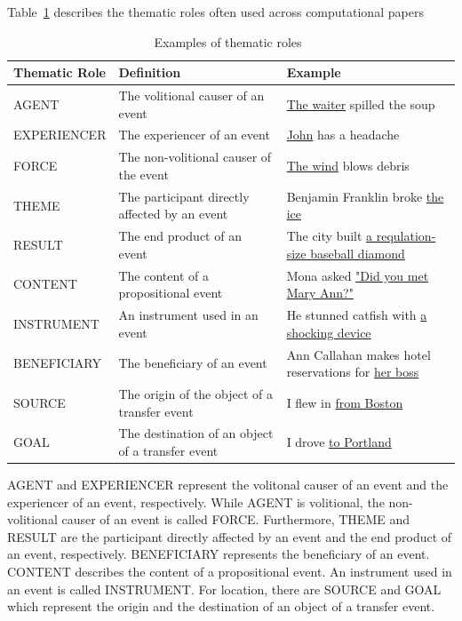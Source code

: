 Table~\ref{tab:examplesrl3} describes the thematic roles often used across computational papers~\citep{jurafsky2016speech}
\begin{table}
	\scriptsize
	\centering
	\caption{Examples of thematic roles~\citep{jurafsky2016speech}}
	\label{tab:examplesrl3}
	\begin{tabular}{lll}
		\hline
		\textbf{Thematic Role} & \textbf{Definition} & \textbf{Example} \\
		\hline
		AGENT & The volitional causer of an event & \underline{The waiter} spilled the soup \\
		EXPERIENCER & The experiencer of an event & \underline{John} has a headache \\
		FORCE & The non-volitional causer of the event & \underline{The wind} blows debris \\
		THEME & The participant directly affected by an event & Benjamin Franklin broke \underline{the ice} \\
		RESULT & The end product of an event & The city built \underline{a requlation-size baseball diamond} \\
		CONTENT & The content of a propositional event & Mona asked \underline{"Did you met Mary Ann?"} \\
		INSTRUMENT & An instrument used in an event & He stunned catfish with \underline{a shocking device} \\
		BENEFICIARY & The beneficiary of an event & Ann Callahan makes hotel reservations for \underline{her boss} \\
		SOURCE & The origin of the object of a transfer event & I flew in \underline{from Boston} \\
		GOAL & The destination of an object of a transfer event & I drove \underline{to Portland} \\
		\hline
	\end{tabular}

\end{table}

AGENT and EXPERIENCER represent the volitonal causer of an event and the experiencer of an event, respectively. While AGENT is volitional, the non-volitional causer of an event is called FORCE. Furthermore, THEME and RESULT are the participant directly affected by an event and the end product of an event, respectively. BENEFICIARY represents the beneficiary of an event. CONTENT describes the content of a propositional event. An instrument used in an event is called INSTRUMENT. For location, there are SOURCE and GOAL which represent the origin and the destination of an object of a transfer event.


